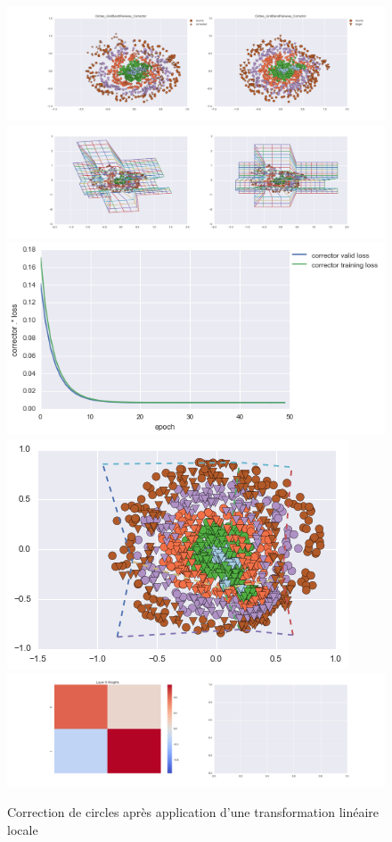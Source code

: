\begin{figure}[H] %
\centering
\includegraphics[width=\linewidth]{fig/24-05-2016/circles/Circles_GridBendPairwise_Corrector-DATA.png}
\includegraphics[width=\linewidth]{fig/24-05-2016/circles/Circles_GridBendPairwise_Corrector-GridCheck.png}
\includegraphics[width=0.45\linewidth]{fig/24-05-2016/circles/Circles_GridBendPairwise_Corrector-Learning_curve.png}
\includegraphics[width=0.45\linewidth]{fig/24-05-2016/circles/circles_grid.png}
\includegraphics[width=\linewidth]{fig/24-05-2016/circles/Circles_GridBendPairwise_Corrector-W.png}
\caption{Correction de circles après application d'une transformation linéaire locale}
\label{fig:recap-circles-GridBend-pairwise}
\end{figure}

